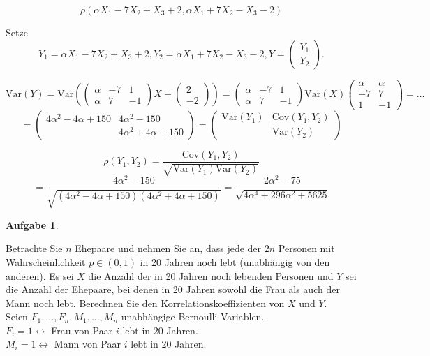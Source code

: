\documentclass[12pt, a4paper]{article}
\theoremstyle{plain}
\theoremstyle{definition}
\newtheorem{aufgabe}{Aufgabe}
\newcommand{\1}{\mathds{1}}
\newcommand{\Var}{\mathrm{Var}}
\newcommand{\Cov}{\mathrm{Cov}}
\begin{document}
\[ \rho(\alpha X_1 - 7X_2 + X_3 + 2, \alpha X_1 + 7X_2 - X_3 -2) \]

Setze \[Y_1 = \alpha X_1 - 7X_2 + X_3 + 2, Y_2 = \alpha X_1 + 7X_2 - X_3 - 2, Y = \begin{pmatrix} Y_1 \\ Y_2 \end{pmatrix}.\]

\[ \Var(Y) = \Var \left( \begin{pmatrix}\alpha & -7 & 1 \\ \alpha & 7 & -1 \end{pmatrix} X + \begin{pmatrix}2\\-2\end{pmatrix} \right) = \begin{pmatrix}\alpha&-7&1\\\alpha&7&-1\end{pmatrix} \Var(X) \begin{pmatrix}\alpha&\alpha\\-7&7\\1&-1\end{pmatrix} = \ldots \]
\[= \begin{pmatrix}4\alpha^2-4\alpha+150 & 4\alpha^2-150 \\ & 4\alpha^2+4\alpha+150\end{pmatrix} = \begin{pmatrix} \Var(Y_1) & \Cov(Y_1,Y_2) \\ & \Var(Y_2)\end{pmatrix}\]

\[ \rho(Y_1,Y_2) = \frac{\Cov(Y_1,Y_2)}{\sqrt{\Var(Y_1)\Var(Y_2)}} \]
\[= \frac{4\alpha^2-150}{\sqrt{(4\alpha^2-4\alpha+150)(4\alpha^2+4\alpha+150)}} = \frac{2\alpha^2-75}{\sqrt{4\alpha^4+296\alpha^2+5625}} \]


\begin{aufgabe} 
\end{aufgabe}


Betrachte Sie \(n\) Ehepaare und nehmen Sie an, dass jede der \(2n\) Personen mit Wahrscheinlichkeit \(p \in (0,1)\) in 20 Jahren noch lebt (unabhängig von den anderen). Es sei \(X\) die Anzahl der in 20 Jahren noch lebenden Personen und \(Y\) sei die Anzahl der Ehepaare, bei denen in 20 Jahren sowohl die Frau als auch der Mann noch lebt. Berechnen Sie den Korrelationskoeffizienten von \(X\) und \(Y\).\\

Seien \(F_1,\dots,F_n, M_1,\dots,M_n\) unabhängige Bernoulli-Variablen.\\
\(F_i=1 \leftrightarrow\) Frau von Paar \(i\) lebt in 20 Jahren.\\
\(M_i=1 \leftrightarrow\) Mann von Paar \(i\) lebt in 20 Jahren.
\end{document}

